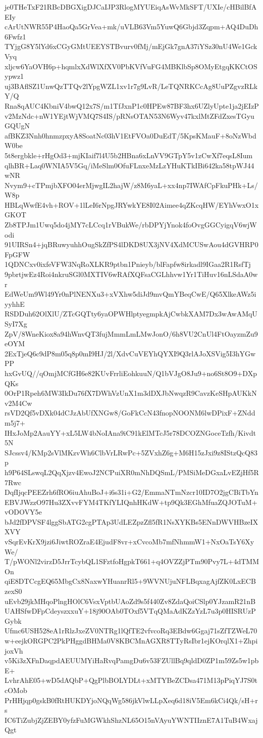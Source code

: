 je0THeTxF21RBcDBGXigDJCaIJP3RlogMYUEiqAsWvMkSFT/UXIe/cHBilBfAEIy
cArUtNWR55P4HaoQa5GrVea+mk/uVLB63Vm5YuwQ6Gbjd3Zqpm+AQ4DuDh6Fwfz1
TYjgG8Y5lYd6xCGyGMtUEEYSTBvurv0fMj/mEjGk7gnA37iYSz30nU4We1GckVyq
xljcw6YaOVH6p+hqmlxXdWlXfXV0PbKVfVuFG4MBKlbSp8OMyEtgqKKCtOSypwz1
uj3BAflSZ1UnwQzTTQv2lYpgWZL1xv1r7g9LvR/LeTQNRKCcAg8UuPZgvzRLkY/Q
Rna8qAUC4KbniV4bwQ12x7S/m1TfJxnP1c0HPEw87BF3hx6UZlyUpte1ja2jEIzP
v2MzNdc+nW1YEjtWjVMQ7S4IS/pRNsOTAN53N6Wyv47kxlMtZFdZxesTGyuGQUgN
afBKZ3Nnh0hnmzpxyA8SoatNc03hV1EtFVOa0DuEdT/5KpsKMauF+8oNzWbdW0be
5t8ergbkle+rHgOd3+mjKIaif7l4U5b2HBna6xLnVV9GTpY5v1zCwXf7eqsL8Ium
qlhBR+Laq0WNIA5V5Gq/iMeSlm0OfuFLnxeMzLzYHuKTkIBi642ka58tpWJ44wNR
Nvym9+cTPmjbXFO04erMjwgIL2hajW/z8M6yaL+xx4np7IWAfCpFkuPHk+Ls/W8p
HBLqWwfE4vh+ROV+1lLeI6rNpgJRYwkYE8I02Aimee4qZKcqHW/EYhVwxO1xGKOT
Zb8TPJm1Uwq5do4jMY7cLCcq1rVBukWe/rbDPYjYnok4foOvgGGCyigqV6wjWodi
91UIRSn4+jqBRuwyuhhOugSkZfPS4lDKD8UX3jNV4XdMCUSwAou4dGVHRP0FpGFW
1QDNCxv0ixfeVFW3NqRoXLKR9ptbn1Pnieyb/blFapfw8irkadl9IGaa2R1RsfTj
9pbrtjwEz4Roi4nkruSGl0MXTIV6wRAfXQFsaCGLhhvw1Yr1TiHuv16nLSdaA0wr
EdWeUm9Wl49Yr0nPlNENXu3+xVXhw5diJd9mvQmYBeqCwE/Q65XlkeAWz5iyyhhE
RSDDuh62OlXlU/ZTcGQTty6yaOPWHlptyegmpkAjCwbkXAM7Dx3wAwAMqUSyI7Xg
ZpV/8WneKiox8a94hWnvQT3fujMmmLmLMwJonO/6h8VU2CnUl4FtOayzmZu9eOYM
2ExTjeQ6c9dP8m05q8p0mI9HJ/2l/XdvCuVEYhQYXI9Q3rlAJoXSVig5I3hYGwPP
hxGvUQ//qOmjMCfGH6e82KUvFrrliEohkuuN/Q1bVJgO8Ju9+no6St8O9+DXpQKs
0OrP1Rpeh6MW3IkDu76fX7DWhVzUnX1m3dDXJbNwqzR9CavzKeSHpAUKkNv2M4Cw
rsVD2Qf5vDXk04dCJzAbUfXNGw8/GoFkCcN43fnopNOONM6lwDPixF+ZNddm5j7+
IHxJoMp2AauYY+xL5LW4bNoIAna9iC91kElMTcJ5r78DCOZNGoceTzfh/Kivdt5N
SJcssv4/KMp2sVlMKzvWh6ClbVrLRwPc+5ZVxhZ6g+M6H15zJxi9z8IStzQcQ83p
h9P64SLswqL2QqXjzv4EwoJ2NCPuiXR0mNhDQSmL/PMSiMeDGxaLvEZjHf5R7Rwc
DqfIjqcPEEZrh6fRO6iuAhuBoJ+i6s31i+G2/EmmaNTmNzcr10ID7O2jgCBiTbYn
EBVJWzzO97Hu3ZXvvFYM4TKfYLIQnhHKdW+tp9Qk3EGhMfuaZQJOTuM+vODOVY5e
bJd2fDPVSF4lggSbATG2cgPTAp3UdLEZpzZfl5fR1NsXYKBs5ENnDWVHBzeIXXVY
vSqrEvKrX9jzi6JiwtROZraE4EjudF8vr+xCvcoMb7mfNhmmW1+NxOaTsY6XyWe/
T/pWONl2virzD5JrrTcybQL1SFztfoHgpkT661+q4OVZZjPTm90Pvy7L+4dTMMOn
qiE8DTCcgEQ65MbgCx8NaxwYHuanrRl5+9WVNUjuNFLBqxagAjfZK0LxECBzexS0
uEvb29jkMHqoPlngHOlC6VsxVptbUAoZd9s5f440Zv8ZdaQoiCSlp0YJzamR21nB
UAHSfwDFpCdeyszxxuY+18j90OAb0TOxf5VTqQMaAdKZzYzL7u3p0HISRUzPGybk
Ufmc6USH528eA1rRlzJxeZV0NTRg1lQfTE2vfvcoRq3EBdw6Ggaj71sZfTZWeL70
w+eejkORGPC2PkPHggdBHMa0V8KBCMnAGXR8TTyRsIbr1ejKOrqlX1+ZhpijoxVh
v5Ki3zXFnDaqpdAEUUMYiHaRvqPamgDu6v53FZUllBq9qldD0ZP1m59Zs5w1pbE+
LvhrAhE05+wD5dAQbP+QgPlbBOLYDLt+xMTYBeZCDsa471M13pPiqYJ7S0tcOMob
PrHHjqp0gskB0fRtHUKDYjoNQqWg586jkVlwLLpXeq6d18iV5Em6kCi4Qk/sH+rs
IC6TiZubjZjZEBY0yfzFuMGWkhShzNL65O15nVAyuYWNTIIznE7A1TuB4WxajQgt
